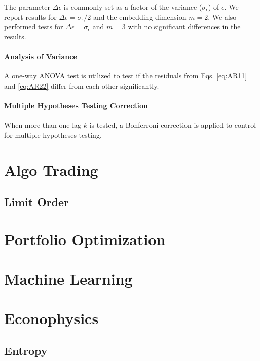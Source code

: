 \documentclass[]{book}
\theoremstyle{definition}
\theoremstyle{definition}
\theoremstyle{definition}
\theoremstyle{remark}
\begin{document}
The parameter \(\Delta \epsilon\) is commonly set as a factor of the
variance (\(\sigma_\epsilon\)) of \(\epsilon\). We report results for
\(\Delta \epsilon = \sigma_\epsilon/2\) and the embedding dimension
\(m = 2\). We also performed tests for
\(\Delta \epsilon = \sigma_\epsilon\) and \(m = 3\) with no significant
differences in the results.

\subsection{Analysis of Variance}\label{analysis-of-variance}

A one-way ANOVA test is utilized to test if the residuals from Eqs.
\eqref{eq:AR11} and \eqref{eq:AR22} differ from each other significantly.

\subsection{Multiple Hypotheses Testing
Correction}\label{multiple-hypotheses-testing-correction}

When more than one lag \(k\) is tested, a Bonferroni correction is
applied to control for multiple hypotheses testing.

\part{Algo Trading}\label{part-algo-trading}

\chapter{Limit Order}\label{limit-order}

\part{Portfolio
Optimization}\label{part-portfolio-optimization}

\part{Machine Learning}\label{part-machine-learning}

\part{Econophysics}\label{part-econophysics}

\chapter{Entropy}\label{entropy}
\end{document}
